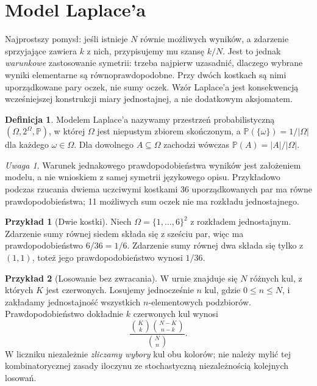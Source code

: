 \documentclass[11pt,a4paper,oneside]{report}
\numberwithin{equation}{chapter}
\theoremstyle{plain}
\theoremstyle{definition}
\newtheorem{definicja}{Definicja}[chapter]
\newtheorem{przyklad}{Przykład}[chapter]
\theoremstyle{remark}
\newtheorem{uwaga}{Uwaga}[chapter]
\newcommand{\Prob}{\mathbb{P}}
\begin{document}
\section{Model Laplace'a}
Najprostszy pomysł: jeśli istnieje $N$ równie możliwych wyników,
a zdarzenie sprzyjające zawiera $k$ z nich, przypisujemy mu
szansę $k/N$. Jest to jednak \emph{warunkowe} zastosowanie
symetrii: trzeba najpierw uzasadnić, dlaczego wybrane wyniki
elementarne są równoprawdopodobne. Przy dwóch kostkach są nimi
uporządkowane pary oczek, nie sumy oczek. Wzór Laplace'a jest
konsekwencją wcześniejszej konstrukcji miary jednostajnej,
a nie dodatkowym aksjomatem.

\begin{definicja}
Modelem Laplace'a nazywamy przestrzeń probabilistyczną
$(\Omega,2^\Omega,\Prob)$, w której $\Omega$ jest niepustym zbiorem
skończonym, a $\Prob(\{\omega\})=1/|\Omega|$ dla każdego
$\omega\in\Omega$. Dla dowolnego $A\subseteq\Omega$ zachodzi wówczas
$\Prob(A)=|A|/|\Omega|$.
\end{definicja}

\begin{uwaga}
Warunek jednakowego prawdopodobieństwa wyników jest założeniem
modelu, a nie wnioskiem z samej symetrii językowego opisu.
Przykładowo podczas rzucania dwiema uczciwymi kostkami
36 uporządkowanych par ma równe prawdopodobieństwa; 11 możliwych sum
oczek nie ma rozkładu jednostajnego.
\end{uwaga}

\begin{przyklad}[Dwie kostki]
Niech $\Omega=\{1,\ldots,6\}^2$ z rozkładem jednostajnym.
Zdarzenie sumy równej siedem składa się z sześciu par,
więc ma prawdopodobieństwo $6/36=1/6$. Zdarzenie sumy równej dwa
składa się tylko z $(1,1)$, toteż jego prawdopodobieństwo wynosi $1/36$.
\end{przyklad}

\begin{przyklad}[Losowanie bez zwracania]
W urnie znajduje się $N$ różnych kul, z których $K$ jest czerwonych.
Losujemy jednocześnie $n$ kul, gdzie $0\leq n\leq N$, i zakładamy
jednostajność wszystkich $n$-elementowych podzbiorów.
Prawdopodobieństwo dokładnie $k$ czerwonych kul wynosi
\[
\frac{\binom Kk\binom{N-K}{n-k}}{\binom Nn}.
\]
W liczniku niezależnie \emph{zliczamy wybory} kul obu kolorów;
nie należy mylić tej kombinatorycznej zasady iloczynu
ze stochastyczną niezależnością kolejnych losowań.
\end{przyklad}
\end{document}
